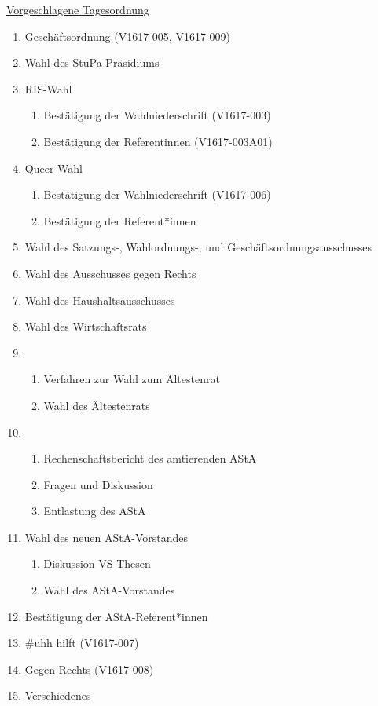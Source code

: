 \documentclass[ngerman,headheight=70pt]{scrartcl}
\begin{document}
    \underline{Vorgeschlagene Tagesordnung}
    \begin{enumerate}[label={\textbf{Top \theenumi}},leftmargin=*]
        \item Geschäftsordnung (V1617-005, V1617-009)
        \item Wahl des StuPa-Präsidiums
        \item RIS-Wahl
            \begin{enumerate}
                \item Bestätigung der Wahlniederschrift (V1617-003)
                \item Bestätigung der Referentinnen (V1617-003A01)
            \end{enumerate}
        \item Queer-Wahl
            \begin{enumerate}
                \item Bestätigung der Wahlniederschrift (V1617-006)
                \item Bestätigung der Referent*innen
            \end{enumerate}
        \item Wahl des Satzungs-, Wahlordnungs-, und Geschäftsordnungsausschusses
        \item Wahl des Ausschusses gegen Rechts
        \item Wahl des Haushaltsausschusses
        \item Wahl des Wirtschaftsrats
        \item
            \begin{enumerate}
                \item Verfahren zur Wahl zum Ältestenrat
                \item Wahl des Ältestenrats
            \end{enumerate}
        \item
            \begin{enumerate}
                \item Rechenschaftsbericht des amtierenden AStA
                \item Fragen und Diskussion
                \item Entlastung des AStA
            \end{enumerate}
        \item Wahl des neuen AStA-Vorstandes
            \begin{enumerate}
                \item Diskussion VS-Thesen
                \item Wahl des AStA-Vorstandes
            \end{enumerate}
        \item Bestätigung der AStA-Referent*innen
        \item #uhh hilft (V1617-007)
        \item Gegen Rechts (V1617-008)
        \item Verschiedenes
    \end{enumerate}
\end{document}
